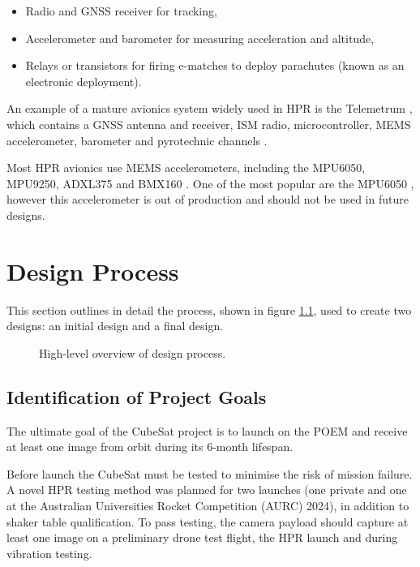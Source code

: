 \documentclass{report}
\begin{document}
\begin{itemize}
  \item Radio and GNSS receiver for tracking,
  \item Accelerometer and barometer for measuring acceleration and altitude,
  \item Relays or transistors for firing e-matches to deploy parachutes (known as an electronic deployment).
\end{itemize}

An example of a mature avionics system widely used in HPR is the Telemetrum \cite{telemetrum,telaak2023designing}, which contains a GNSS antenna and receiver, ISM radio, microcontroller, MEMS accelerometer, barometer and pyrotechnic channels \cite{telemetrum}.

Most HPR avionics use MEMS accelerometers, including the MPU6050, MPU9250, ADXL375 and BMX160 \cite{telaak2023designing}. One of the most popular are the MPU6050 \cite{telaak2023designing,moschidis2022arduino}, however this accelerometer is out of production and should not be used in future designs.

\chapter{Design Process}
\label{sec:design-process}

This section outlines in detail the process, shown in figure \ref{fig:design-process-hl}, used to create two designs: an initial design and a final design.

\begin{figure}[H]
  \centering
  
  \caption{High-level overview of design process.}
  \label{fig:design-process-hl}
\end{figure}

\section{Identification of Project Goals}
\label{sec:constraints-and-requirements}

The ultimate goal of the CubeSat project is to launch on the POEM and receive at least one image from orbit during its 6-month lifespan.

Before launch the CubeSat must be tested to minimise the risk of mission failure. A novel HPR testing method was planned for two launches (one private and one at the Australian Universities Rocket Competition (AURC) 2024), in addition to shaker table qualification. To pass testing, the camera payload should capture at least one image on a preliminary drone test flight, the HPR launch and during vibration testing.
\end{document}

